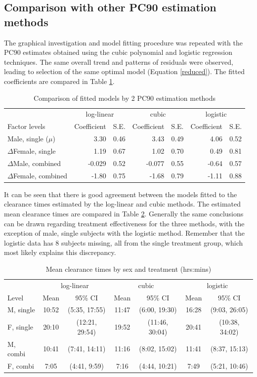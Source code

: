 \subsection{Comparison with other PC90 estimation methods}
The graphical investigation and model fitting procedure was repeated with the PC90 estimates obtained using the cubic polynomial and logistic regression techniques. The same overall trend and patterns of residuals were observed, leading to selection of the same optimal model (Equation \ref{reduced}). The fitted coefficients are compared in Table \ref{compmeth}. 
\begin{table}[h]
\centering
\caption{Comparison of fitted models by 2 PC90 estimation methods}\label{compmeth}
\begin{tabular}{l|rr|rr|rr}
&\multicolumn{2}{c|}{log-linear}&\multicolumn{2}{c|}{cubic}&\multicolumn{2}{c}{logistic}\\
Factor levels&Coefficient&S.E.&Coefficient&S.E.&Coefficient&S.E.\\
\hline
Male, single ($\mu$)			& 3.30 & 0.46 & 3.43 &  0.49 & 4.06 & 0.52\\
$\Delta$Female, single		& 1.19 & 0.67 & 1.02 & 0.70  & 0.49 & 0.81\\
$\Delta$Male, combined		& -0.029 & 0.52 & -0.077 & 0.55 & -0.64 & 0.57\\
$\Delta$Female, combined	& -1.80 & 0.75 & -1.68 & 0.79  & -1.11 & 0.88\\
\hline
\end{tabular}
\end{table}

It can be seen that there is good agreement between the models fitted to the clearance times estimated by the log-linear and cubic methods. The estimated mean clearance times are compared in Table \ref{compinf}. Generally the same conclusions can be drawn regarding treatment effectiveness for the three methods, with the exception of male, single subjects with the logistic method. Remember that the logistic data has 8 subjects missing, all from the single treatment group, which most likely explains this discrepancy.
\begin{table}[h]
\centering
\caption{Mean clearance times by sex and treatment (hrs:mins)}\label{compinf}
\begin{tabular}{|l|cc|cc|cc|}
\hline
&\multicolumn{2}{c|}{log-linear}&\multicolumn{2}{c|}{cubic}&\multicolumn{2}{c|}{logistic}\\
Level		&Mean&95\% CI&Mean&95\% CI&Mean&95\% CI\\
\hline
M, single 		& 10:52 & (5:35, 17:55) &11:47& (6:00, 19:30) & 16:28 &(9:03, 26:05)\\
F, single		& 20:10 & (12:21,  29:54) &19:52&(11:46, 30:04) & 20:41&(10:38, 34:02)\\
M, combi	 	& 10:41 & (7:41, 14:11) &11:16&(8:02, 15:02) & 11:41 &(8:37, 15:13)\\
F, combi	 	& 7:05 & (4:41, 9:59) &7:16&(4:44, 10:21) & 7:49 & (5:21, 10:46)\\
\hline
\end{tabular}
\end{table}

